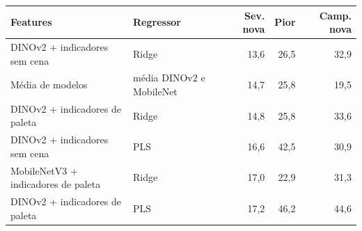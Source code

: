 \begin{tabular}{llrrr}
\toprule
Features & Regressor & Sev. nova & Pior & Camp. nova \\
\midrule
DINOv2 + indicadores sem cena & Ridge & 13,6 & 26,5 & 32,9 \\
Média de modelos & média DINOv2 e MobileNet & 14,7 & 25,8 & 19,5 \\
DINOv2 + indicadores de paleta & Ridge & 14,8 & 25,8 & 33,6 \\
DINOv2 + indicadores sem cena & PLS & 16,6 & 42,5 & 30,9 \\
MobileNetV3 + indicadores de paleta & Ridge & 17,0 & 22,9 & 31,3 \\
DINOv2 + indicadores de paleta & PLS & 17,2 & 46,2 & 44,6 \\
\bottomrule
\end{tabular}
